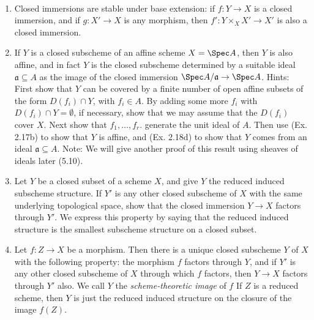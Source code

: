 \begin{exercise}[Closed Subschemes]%
	~
	\begin{enumerate}
		\item Closed immersions are stable under base extension: if $f: Y\to X$ is a closed immersion, and if $g:X'\to X$ is any morphism, then $f':Y\times_X X' \to X'$ is also a closed immersion.
		\item If $Y $ is a closed subscheme of an affine scheme $X = \Spec A $, then $Y$ is also affine, and in fact $Y$ is the closed subscheme determined by a suitable ideal $\mathfrak{a} \subseteq A $ as the image of the closed immersion $\Spec A/\mathfrak{a} \to \Spec A$. 
			\ifhint
				Hints: First show that $Y$ can be covered by a finite number of open affine subsets of the form $D(f_i) \cap Y$, with $f_i \in A $. By adding some more $f_i $ with $D(f_i) \cap Y = \emptyset$, if necessary, show that we may assume that the $D(f_i)$ cover $X$. Next show that $f_1, \ldots,f_r$. generate the unit ideal of $A$. Then use (Ex. 2.17b) to show that $Y$ is affine, and (Ex. 2.18d) to show that $Y$ comes from an ideal $\mathfrak{a} \subseteq A$.
			\fi
			Note: We will give another proof of this result using sheaves of ideals later (5.10). 
		\item Let $Y $ be a closed subset of a scheme $X $, and give $Y $ the reduced induced subscheme structure. If $Y'$ is any other closed subscheme of $X$ with the same underlying topological space, show that the closed immersion $Y \to X$ factors through $Y'$. We express this property by saying that the reduced induced structure is the smallest subscheme structure on a closed subset. 
		\item Let $f:Z \to X$ be a morphism. Then there is a unique closed subscheme $Y$ of $X$ with the following property: the morphism $f$ factors through $Y$, and if $Y'$ is any other closed subscheme of $X$ through which $f$ factors, then $Y \to X$ factors through $Y'$ also. We call $Y$ the \textit{scheme-theoretic image} of $f$ If $Z$ is a reduced scheme, then $Y$ is just the reduced induced structure on the closure of the image $f(Z)$.
	\end{enumerate}
\end{exercise}
